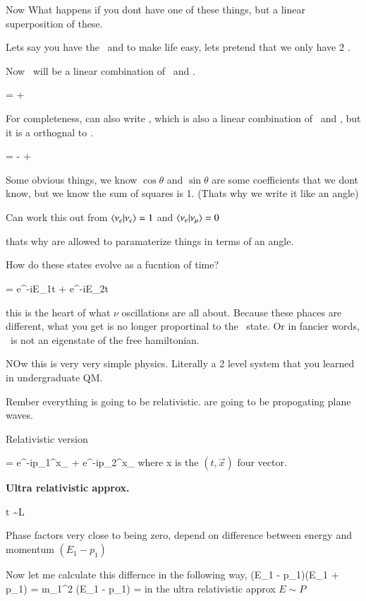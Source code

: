 {Now What happens if you dont have one of these things, but a linear superposition of these. 

Lets say you have the \nue\ and to make life easy, lets pretend that we only have 2 \nus. 

Now \nue\ will be a linear combination of \nuone\ and \nutwo. 

\be
\ket{\nue} = \cos\theta \ket{\nuone} + \sin\theta \ket{\nutwo}
\ee

For completeness, can also write \numu, which is also a linear combination of \nuone\ and \nutwo, but it is a orthognal to \nue.

\be
\ket{\numu} = -\sin\theta \ket{\nuone} + \cos\theta \ket{\nutwo}
\ee


Some obvious things, we know $\cos\theta$ and $\sin\theta$ are some coefficients that we dont know, but we know the sum of squares is 1. 
(Thats why we write it like an angle) 

Can work this out from 
$\braket{\nu_e | \nu_e}  = 1$ and $\braket{\nu_e | \nu_\mu}  = 0$

thats why are allowed to paramaterize things in terms of an angle. 

How do these states evolve as a fucntion of time?

\be
{} = \cos\theta e^{-iE_1t} \ket{\nuone} + \sin\theta e^{-iE_2t}\ket{\nutwo}
\ee

this is the heart of what $\nu$ oscillations are all about. 
Because these phaces are different, what you get is no longer proportinal to the \nue\ state.
Or in fancier words, \nue\ is not an eigenstate of the free hamiltonian.

NOw this is very very simple physics. 
Literally a 2 level system that you learned in undergraduate QM.


Rember everything is going to be relativistic. 
\nus are going to be propogating plane waves. 

Relativistic version 

\be
{} = \cos\theta e^{-ip_1^\mu x_\mu} \ket{\nuone} + \sin\theta e^{-ip_2^\mu x_\mu}\ket{\nutwo}
\ee
where x is the $(t,\vec{x})$ four vector. 

\textbf{Ultra relativistic approx. }

\be
t \sim L 
\ee

Phase factors very close to being zero, depend on difference between energy and momentum $(E_1 - p_1)$


Now let me calculate this differnce in the following way,
\be
(E_1 - p_1)(E_1 + p_1) = m_1^2  \Rightarrow  (E_1 - p_1) =  
\ee
in the ultra relativistic approx $E \sim P$


}

